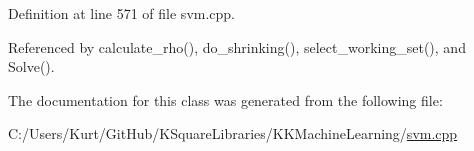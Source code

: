 Definition at line 571 of file svm.\+cpp.



Referenced by calculate\+\_\+rho(), do\+\_\+shrinking(), select\+\_\+working\+\_\+set(), and Solve().



The documentation for this class was generated from the following file\+:\begin{DoxyCompactItemize}
\item 
C\+:/\+Users/\+Kurt/\+Git\+Hub/\+K\+Square\+Libraries/\+K\+K\+Machine\+Learning/\hyperlink{svm_8cpp}{svm.\+cpp}\end{DoxyCompactItemize}
